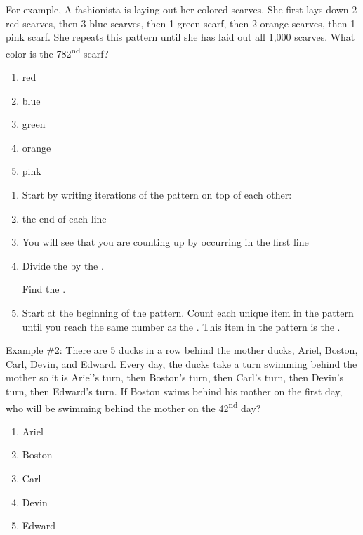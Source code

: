 \bigskip
For example, A fashionista is laying out her colored scarves. She first lays down 2 red scarves, then 3 blue scarves, then 1 green scarf, then 2 orange scarves, then 1 pink scarf. She repeats this pattern until she has laid out all 1,000 scarves. What color is the 782\textsuperscript{nd} scarf?

\begin{enumerate}[label=(\Alph*)]
\item red
\item blue
\item green
\item orange
\item pink
\end{enumerate}

\begin{enumerate}
\item Start by writing \longline iterations of the pattern on top of each other:
\vfill\item \longline the end of each line
\vfill\item You will see that you are counting up by \longline occurring in the first line
\vfill\item Divide the \longline by the \longline.

Find the \longline.
\vfill\item Start at the beginning of the pattern. Count each unique item in the pattern until you reach the same number as the \longline. This item in the pattern is the \longline.
\end{enumerate}

Example \#2: There are 5 ducks in a row behind the mother ducks, Ariel, Boston, Carl, Devin, and Edward. Every day, the ducks take a turn swimming behind the mother so it is Ariel's turn, then Boston's turn, then Carl's turn, then Devin's turn, then Edward's turn. If Boston swims behind his mother on the first day, who will be swimming behind the mother on the 42\textsuperscript{nd} day?

\begin{enumerate}[label=(\Alph*)]
\item Ariel
\item Boston
\item Carl
\item Devin
\item Edward
\end{enumerate}

